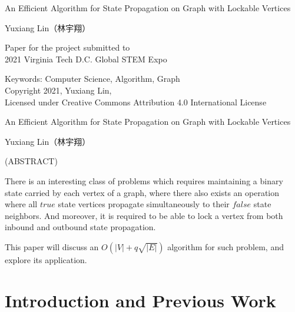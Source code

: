 \documentclass[12pt]{report}
\begin{document}
\thispagestyle{empty}
\begin{center}

{\Large An Efficient Algorithm for State Propagation on Graph with Lockable Vertices}

\vfill

Yuxiang Lin（林宇翔）

\vfill

Paper for the project submitted to \\
2021 Virginia Tech D.C. Global STEM Expo

\vfill

Keywords: Computer Science, Algorithm, Graph \\
Copyright 2021, Yuxiang Lin, \\
Licensed under Creative Commons Attribution 4.0 International License

\end{center}

\pagebreak

\thispagestyle{empty}
\begin{center}

{\large An Efficient Algorithm for State Propagation on Graph with Lockable Vertices}

\vfill

Yuxiang Lin（林宇翔）

\vfill

(ABSTRACT)

\vfill

\end{center}

There is an interesting class of problems which requires maintaining a binary state carried by each vertex of a graph,
where there also exists an operation where all $ \mathit{true} $ state vertices propagate simultaneously to their $ \mathit{false} $ state neighbors.
And moreover, it is required to be able to lock a vertex from both inbound and outbound state propagation.

This paper will discuss an $ O\left(\lvert V \rvert + q \sqrt{\lvert E \rvert} \right) $ algorithm for such problem, and explore its application.

\pagebreak

\tableofcontents
\pagebreak

\pagestyle{myheadings}

\chapter{Introduction and Previous Work}
\end{document}
